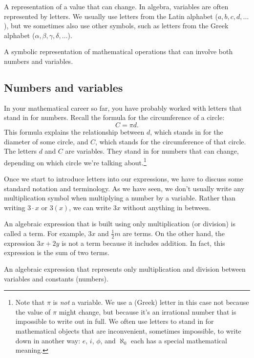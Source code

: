 \begin{boxdef}[Variable]
A representation of a value that can change. In algebra, variables are often represented by letters. We usually use letters from the Latin alphabet ($a, b, c, d,\dotsc$), but we sometimes also use other symbols, such as letters from the Greek alphabet ($\alpha, \beta, \gamma, \delta, \dotsc$).
\end{boxdef}

\begin{boxdef}
A symbolic representation of mathematical operations that can involve both numbers and variables.
\end{boxdef}

\subsection{Numbers and variables}

In your mathematical career so far, you have probably worked with letters that stand in for numbers. Recall the formula for the circumference of a circle: \[C = \pi d.\]
This formula explains the relationship between $d$, which stands in for the diameter of some circle, and $C$, which stands for the circumference of that circle. The letters $d$ and $C$ are variables. They stand in for numbers that can change, depending on which circle we're talking about.\footnote{Note that $\pi$ is \textit{not} a variable. We use a (Greek) letter in this case not because the value of $\pi$ might change, but because it's an irrational number that is impossible to write out in full. We often use letters to stand in for mathematical objects that are inconvenient, sometimes impossible, to write down in another way: $e$, $i$, $\phi$, and $\aleph_0$ each has a special mathematical meaning.}

Once we start to introduce letters into our expressions, we have to discuss some standard notation and terminology. As we have seen, we don't usually write any multiplication symbol when multiplying a number by a variable. Rather than writing $3\cdot x$ or $3(x)$, we can write $3x$ without anything in between.

An algebraic expression that is built using only multiplication (or division) is called a \gls{term}. For example, $3x$ and $\frac{1}{2}m$ are terms. On the other hand, the expression $3x+2y$ is not a term because it includes addition. In fact, this expression is the sum of two terms.

\begin{boxdef}[Term]
An algebraic expression that represents only multiplication and division between variables and constants (numbers).
\end{boxdef}

